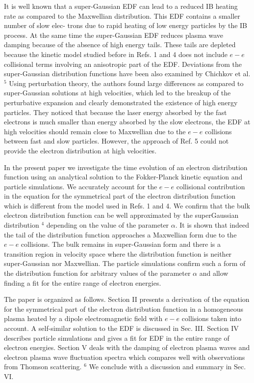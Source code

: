 \documentclass[10pt]{article}
\begin{document}
It is well known that a super-Gaussian EDF can lead to a reduced IB heating rate as compared to the Maxwellian distribution. This EDF contains a smaller number of slow elec- trons due to rapid heating of low energy particles by the IB process. At the same time the super-Gaussian EDF reduces plasma wave damping because of the absence of high energy tails. These tails are depleted because the kinetic model studied before in Refs. 1 and 4 does not include $e-e$ collisional terms involving an anisotropic part of the EDF. Deviations from the super-Gaussian distribution functions have been also examined by Chichkov et al. ${ }^{5}$ Using perturbation theory, the authors found large differences as compared to super-Gaussian solutions at high velocities, which led to the breakup of the perturbative expansion and clearly demonstrated the existence of high energy particles. They noticed that because the laser energy absorbed by the fast electrons is much smaller than energy absorbed by the slow electrons, the EDF at high velocities should remain close to Maxwellian due to the $e-e$ collisions between fast and slow particles. However, the approach of Ref. 5 could not provide the electron distribution at high velocities.

In the present paper we investigate the time evolution of an electron distribution function using an analytical solution to the Fokker-Planck kinetic equation and particle simulations. We accurately account for the $e-e$ collisional contribution in the equation for the symmetrical part of the electron distribution function which is different from the model used in Refs. 1 and 4. We confirm that the bulk electron distribution function can be well approximated by the superGaussian distribution ${ }^{4}$ depending on the value of the parameter $\alpha$. It is shown that indeed the tail of the distribution function approaches a Maxwellian form due to the $e-e$ collisions. The bulk remains in super-Gaussian form and there is a transition region in velocity space where the distribution function is neither super-Gaussian nor Maxwellian. The particle simulations confirm such a form of the distribution function for arbitrary values of the parameter $\alpha$ and allow finding a fit for the entire range of electron energies.

The paper is organized as follows. Section II presents a derivation of the equation for the symmetrical part of the electron distribution function in a homogeneous plasma heated by a dipole electromagnetic field with $e-e$ collisions taken into account. A self-similar solution to the EDF is discussed in Sec. III. Section IV describes particle simulations and gives a fit for EDF in the entire range of electron energies. Section $\mathrm{V}$ deals with the damping of electron plasma waves and electron plasma wave fluctuation spectra which compares well with observations from Thomson scattering. ${ }^{6}$ We conclude with a discussion and summary in Sec. VI.
\end{document}
